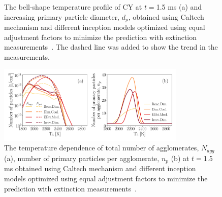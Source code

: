 \begin{figure}[H]
	\centering
	\caption{The bell-shape temperature profile of CY at $t=$1.5 ms (a) and increasing primary particle diameter, $d_p$, obtained using Caltech mechanism and different inception models optimized using equal adjustment factors to minimize the prediction with extinction measurements~\citep{agafonov2016unified}. The dashed line was added to show the trend in the measurements.}
	\label{fig:shockagof_yield_dp_cpr} 
\end{figure}


\begin{figure}[H]
	\centering
	\includegraphics[width=0.8\textwidth]{Figures/Results/Shocktube/Agafonov2016_cpr/N_agg_n_p_5CH4.pdf}
	\caption{The temperature dependence of total number of agglomerates, $N_{agg}$ (a), number of primary particles per agglomerate, $n_p$ (b) at $t=$1.5 ms obtained using Caltech mechanism and different inception models optimized using equal adjustment factors to minimize the prediction with extinction measurements~\citep{agafonov2016unified}.}
	\label{fig:shockagof_Nagg_np_cpr} 
\end{figure}

